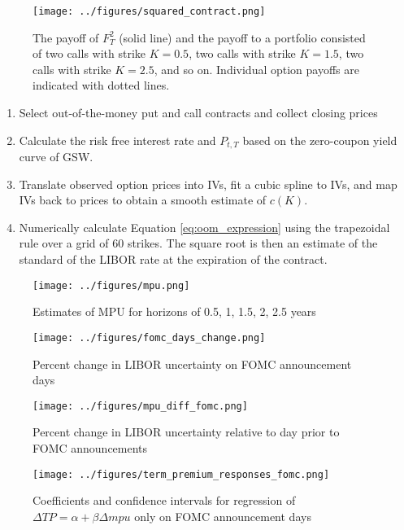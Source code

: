 \documentclass[11pt]{article}
\begin{document}
\begin{figure}
	\centering
	\texttt{[image: ../figures/squared\_contract.png]}
	\caption{The payoff of $F_{T}^{2}$ (solid line) and the payoff to a portfolio consisted of two calls with strike $K = 0.5$, two calls with strike $K = 1.5$, two calls with strike $K = 2.5$, and so on. Individual option payoffs are indicated with dotted lines. }
	\label{fig:squared_contract}
\end{figure}

\begin{enumerate}
	\item Select out-of-the-money put and call contracts and collect closing prices
	\item Calculate the risk free interest rate and $P_{t, T}$ based on the zero-coupon yield curve of GSW. 
	\item Translate observed option prices into IVs, fit a cubic spline to IVs, and map IVs back to prices to obtain a smooth estimate of $c(K)$.
	\item Numerically calculate Equation \ref{eq:oom_expression} using the trapezoidal rule over a grid of 60 strikes. The square root is then an estimate of the standard of the LIBOR rate at the expiration of the contract.
\end{enumerate}
\begin{figure}
	\centering
	\texttt{[image: ../figures/mpu.png]}
	\caption{Estimates of MPU for horizons of 0.5, 1, 1.5, 2, 2.5 years}
	\label{fig:mpu}
\end{figure}

\begin{figure}
	\centering
	\texttt{[image: ../figures/fomc\_days\_change.png]}
	\caption{Percent change in LIBOR uncertainty on FOMC announcement days}
	\label{fig:fomc_days}
\end{figure}
\begin{figure}
	\centering
	\texttt{[image: ../figures/mpu\_diff\_fomc.png]}
	\caption{Percent change in LIBOR uncertainty relative to day prior to FOMC announcements}
	\label{fig:fomc_cycle_chg}
\end{figure}


\begin{figure}
	\centering
	\texttt{[image: ../figures/term\_premium\_responses\_fomc.png]}
	\caption{Coefficients and confidence intervals for regression of $\Delta TP = \alpha + \beta \Delta mpu$ only on FOMC announcement days}
	\label{fig:term_premium_responses_fomc}
\end{figure}
\end{document}
